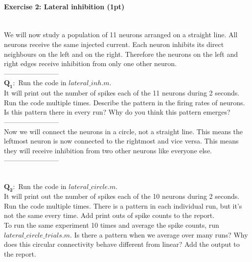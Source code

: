\documentclass[a4paper,11pt]{article}
\newenvironment{exercise}[3]{\paragraph{Exercise #1: #2 (#3pt)}\ \\}{
\medskip}
\newcommand{\question}[2]{\setlength\parindent{10mm}\ \\$\mathbf{Q_#1:}$ #2\ \\}
\begin{document}
%
%
\begin{exercise}{2}{Lateral inhibition}{1}
We will now study a population of 11 neurons arranged on a straight line. All neurons receive the same injected current. Each neuron inhibits its direct neighbours on the left and on the right. Therefore the neurons on the left and right edges receive inhibition from only one other neuron.\\
------------------------
\question{1}{Run the code in $lateral\_inh.m$.\\ It will print out the number of spikes each of the 11 neurons during 2 seconds. Run the code multiple times. Describe the pattern in the firing rates of neurons. Is this pattern there in every run? Why do you think this pattern emerges?}
------------------------\\


Now we will connect the neurons in a circle, not a straight line. This means the leftmost neuron is now connected to the rightmost and vice versa. This means they will receive inhibition from two other neurons like everyone else.\\
------------------------

\question{2}{Run the code in $lateral\_circle.m$.\\ It will print out the number of spikes each of the 10 neurons during 2 seconds. Run the code multiple times. There is a pattern in each individual run, but it's not the same every time. Add print outs of spike counts to the report.\\
To run the same experiment 10 times and average the spike counts, run $lateral\_circle\_trials.m$. Is there a pattern when we average over many runs? Why does this circular connectivity behave different from linear?  Add the output to the report.}
\end{exercise}
\end{document}
